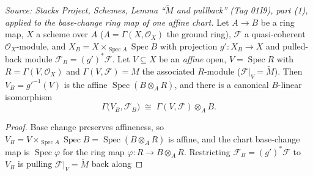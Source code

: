 \begin{lemma}
  \label{lem:base_change_chart_tensor_iso}
  \textit{Source: Stacks Project, Schemes, Lemma ``\(\widetilde M\) and pullback''
  (Tag 01I9), part (1), applied to the base-change ring map of one affine chart.}
  Let \(A \to B\) be a ring map, \(X\) a scheme over \(A\) (\(A = \Gamma(X,\mathcal{O}_X)\)
  the ground ring), \(\mathcal{F}\) a quasi-coherent \(\mathcal{O}_X\)-module, and
  \(X_B = X \times_{\operatorname{Spec} A}\operatorname{Spec} B\) with projection
  \(g' : X_B \to X\) and pulled-back module \(\mathcal{F}_B = (g')^{*}\mathcal{F}\). Let
  \(V \subseteq X\) be an \emph{affine} open, \(V = \operatorname{Spec} R\) with
  \(R = \Gamma(V,\mathcal{O}_X)\) and \(\Gamma(V,\mathcal{F}) = M\) the associated
  \(R\)-module (\(\mathcal{F}|_V = \widetilde M\)). Then \(V_B = g'^{-1}(V)\) is the affine
  \(\operatorname{Spec}(B \otimes_A R)\), and there is a canonical \(B\)-linear isomorphism
  \[
    \Gamma\bigl(V_B, \mathcal{F}_B\bigr)
    \;\cong\;
    \Gamma(V,\mathcal{F}) \otimes_A B .
  \]
  \begin{proof}
    Base change preserves affineness, so \(V_B = V \times_{\operatorname{Spec} A}
    \operatorname{Spec} B = \operatorname{Spec}(B \otimes_A R)\) is affine, and the chart
    base-change map is \(\operatorname{Spec}\varphi\) for the ring map
    \(\varphi : R \to B \otimes_A R\). Restricting \(\mathcal{F}_B = (g')^{*}\mathcal{F}\)
    to \(V_B\) is pulling \(\mathcal{F}|_V = \widetilde M\) back along

\end{proof}
\end{lemma}
